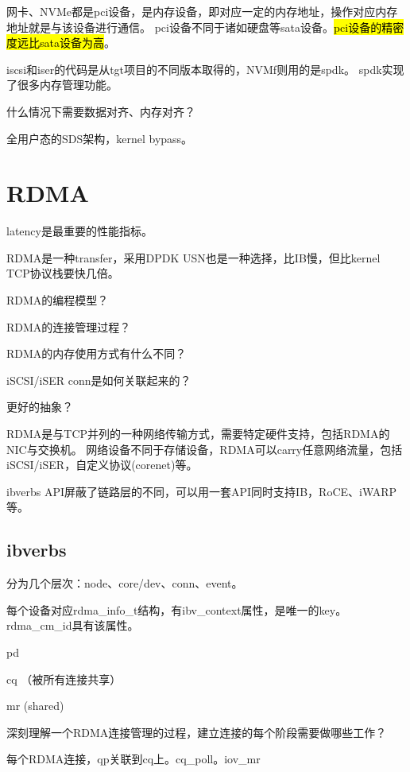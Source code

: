 网卡、NVMe都是pci设备，是内存设备，即对应一定的内存地址，操作对应内存地址就是与该设备进行通信。
pci设备不同于诸如硬盘等sata设备。\hl{pci设备的精密度远比sata设备为高}。

iscsi和iser的代码是从tgt项目的不同版本取得的，NVMf则用的是spdk。
spdk实现了很多内存管理功能。

什么情况下需要数据对齐、内存对齐？

全用户态的SDS架构，kernel bypass。

\section{RDMA}

latency是最重要的性能指标。

RDMA是一种transfer，采用DPDK USN也是一种选择，比IB慢，但比kernel TCP协议栈要快几倍。

\begin{enumbox}
\item RDMA的编程模型？
\item RDMA的连接管理过程？
\item RDMA的内存使用方式有什么不同？
\item iSCSI/iSER conn是如何关联起来的？
\item 更好的抽象？
\end{enumbox}

RDMA是与TCP并列的一种网络传输方式，需要特定硬件支持，包括RDMA的NIC与交换机。
网络设备不同于存储设备，RDMA可以carry任意网络流量，包括iSCSI/iSER，自定义协议(corenet)等。

ibverbs API屏蔽了链路层的不同，可以用一套API同时支持IB，RoCE、iWARP等。

\subsection{ibverbs}

分为几个层次：node、core/dev、conn、event。

每个设备对应rdma\_info\_t结构，有ibv\_context属性，是唯一的key。
rdma\_cm\_id具有该属性。

\begin{itembox}
\item pd
\item cq （被所有连接共享）
\item mr  (shared)
\end{itembox}

深刻理解一个RDMA连接管理的过程，建立连接的每个阶段需要做哪些工作？

每个RDMA连接，qp关联到cq上。cq\_poll。iov\_mr

